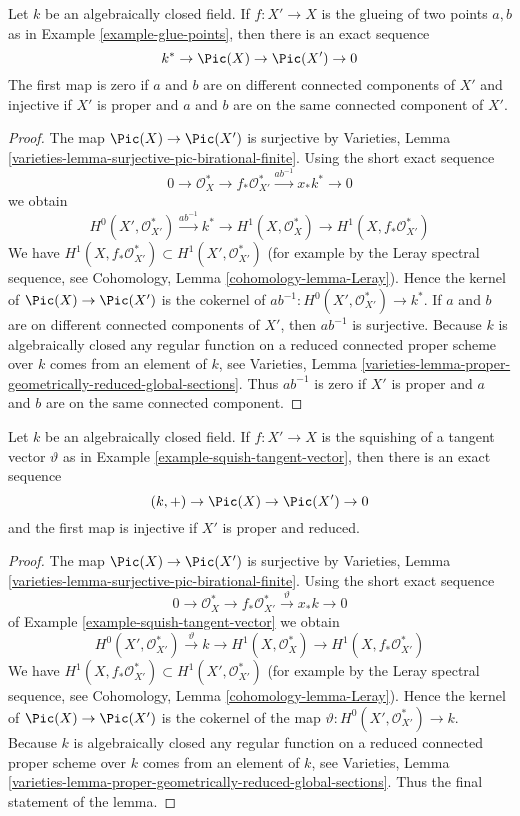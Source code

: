 \begin{lemma}
\label{lemma-glue-points}
Let $k$ be an algebraically closed field. If $f : X' \to X$ is the
glueing of two points $a, b$ as in Example \ref{example-glue-points}, then
there is an exact sequence
$$
k^* \to \Pic(X) \to \Pic(X') \to 0
$$
The first map is zero if $a$ and $b$ are on different
connected components of $X'$ and injective
if $X'$ is proper and $a$ and $b$ are on the same connected component of $X'$.
\end{lemma}

\begin{proof}
The map $\Pic(X) \to \Pic(X')$ is surjective
by Varieties, Lemma \ref{varieties-lemma-surjective-pic-birational-finite}.
Using the short exact sequence
$$
0 \to \mathcal{O}_X^* \to f_*\mathcal{O}_{X'}^*
\xrightarrow{ab^{-1}} x_*k^* \to 0
$$
we obtain
$$
H^0(X', \mathcal{O}_{X'}^*) \xrightarrow{ab^{-1}} k^* \to
H^1(X, \mathcal{O}_X^*) \to H^1(X, f_*\mathcal{O}_{X'}^*)
$$
We have $H^1(X, f_*\mathcal{O}_{X'}^*) \subset H^1(X', \mathcal{O}_{X'}^*)$
(for example by the Leray spectral sequence, see
Cohomology, Lemma \ref{cohomology-lemma-Leray}).
Hence the kernel of $\Pic(X) \to \Pic(X')$ is the
cokernel of $ab^{-1} : H^0(X', \mathcal{O}_{X'}^*) \to k^*$.
If $a$ and $b$ are on different connected components of $X'$,
then $ab^{-1}$ is surjective.
Because $k$ is algebraically closed any regular function on a
reduced connected proper scheme over $k$ comes from an element of $k$, see
Varieties, Lemma
\ref{varieties-lemma-proper-geometrically-reduced-global-sections}.
Thus $ab^{-1}$ is zero if $X'$ is proper and $a$ and $b$ are on
the same connected component.
\end{proof}

\begin{lemma}
\label{lemma-squish-tangent-vector}
Let $k$ be an algebraically closed field. If $f : X' \to X$ is the
squishing of a tangent vector $\vartheta$ as in
Example \ref{example-squish-tangent-vector}, then
there is an exact sequence
$$
(k, +) \to \Pic(X) \to \Pic(X') \to 0
$$
and the first map is injective if $X'$ is proper and reduced.
\end{lemma}

\begin{proof}
The map $\Pic(X) \to \Pic(X')$ is surjective
by Varieties, Lemma \ref{varieties-lemma-surjective-pic-birational-finite}.
Using the short exact sequence
$$
0 \to \mathcal{O}_X^* \to f_*\mathcal{O}_{X'}^*
\xrightarrow{\vartheta} x_*k \to 0
$$
of Example \ref{example-squish-tangent-vector} we obtain
$$
H^0(X', \mathcal{O}_{X'}^*) \xrightarrow{\vartheta} k \to
H^1(X, \mathcal{O}_X^*) \to H^1(X, f_*\mathcal{O}_{X'}^*)
$$
We have $H^1(X, f_*\mathcal{O}_{X'}^*) \subset H^1(X', \mathcal{O}_{X'}^*)$
(for example by the Leray spectral sequence, see
Cohomology, Lemma \ref{cohomology-lemma-Leray}).
Hence the kernel of $\Pic(X) \to \Pic(X')$ is the
cokernel of the map $\vartheta : H^0(X', \mathcal{O}_{X'}^*) \to k$.
Because $k$ is algebraically closed any regular function on a
reduced connected proper scheme over $k$ comes from an element of $k$, see
Varieties, Lemma
\ref{varieties-lemma-proper-geometrically-reduced-global-sections}.
Thus the final statement of the lemma.
\end{proof}


